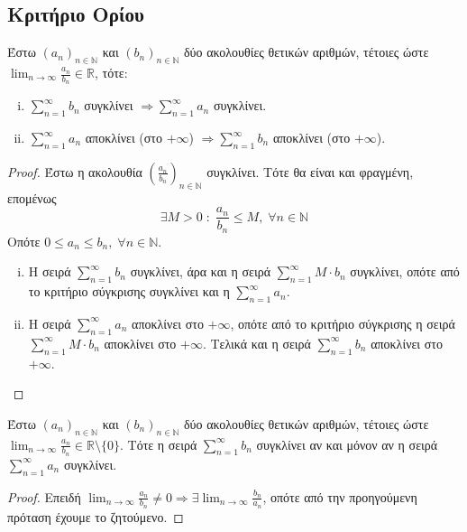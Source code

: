\documentclass[main.tex]{subfiles}
\begin{document}
\subsection{Κριτήριο Ορίου}
\begin{thm}
    Έστω $ {(a_{n})}_{n \in \mathbb{N}} $ και $ {(b_{n})}_{n \in \mathbb{N}} $ δύο 
    ακολουθίες θετικών αριθμών, τέτοιες ώστε $ \lim_{n \to \infty} \frac{a_{n}}{b_{n}}
    \in \mathbb{R} $, τότε: 
    \begin{enumerate}[i)]
        \item $ \sum_{n=1}^{\infty} b_{n} $ συγκλίνει $ \Rightarrow 
            \sum_{n=1}^{\infty} a_{n} $ συγκλίνει.
        \item $ \sum_{n=1}^{\infty} a_{n} $ αποκλίνει (στο $+ \infty$) $ \Rightarrow 
            \sum_{n=1}^{\infty} b_{n} $ αποκλίνει (στο $+ \infty$).
    \end{enumerate}
\end{thm}
\begin{proof}
\item {}
    Έστω η ακολουθία $ {\left(\frac{a_{n}}{b_{n}}\right)}_{n \in \mathbb{N}} $ 
    συγκλίνει.  Τότε θα είναι και φραγμένη, επομένως
    \[
        \exists M>0 \; : \; \frac{a_{n}}{b_{n}} \leq M, \; \forall n \in \mathbb{N} 
    \] 
    Οπότε $ 0 \leq a_{n} \leq b_{n}, \; \forall n \in \mathbb{N} $.
    \begin{enumerate}[i)]
        \item Η σειρά $ \sum_{n=1}^{\infty} b_{n} $ συγκλίνει, άρα και η σειρά 
            $ \sum_{n=1}^{\infty} M\cdot b_{n} $ συγκλίνει, οπότε από το κριτήριο 
            σύγκρισης συγκλίνει και η $ \sum_{n=1}^{\infty} a_{n} $.
        \item Η σειρά $ \sum_{n=1}^{\infty} a_{n} $ αποκλίνει στο $ + \infty $, 
            οπότε από το κριτήριο σύγκρισης η σειρά 
            $ \sum_{n=1}^{\infty} M \cdot b_{n} $ αποκλίνει
            στο $ + \infty $. Τελικά και η σειρά $ \sum_{n=1}^{\infty} b_{n} $ 
            αποκλίνει στο $ + \infty $.
    \end{enumerate}
\end{proof}

\begin{cor}
    Έστω $ {(a_{n})}_{n \in \mathbb{N}} $ και $ {(b_{n})}_{n \in \mathbb{N}} $ δύο 
    ακολουθίες θετικών αριθμών, τέτοιες ώστε $ \lim_{n \to \infty} \frac{a_{n}}{b_{n}} 
    \in \mathbb{R} \setminus \{ 0 \}$. Τότε η σειρά $ \sum_{n=1}^{\infty} b_{n} $ 
    συγκλίνει αν και μόνον αν η σειρά $ \sum_{n=1}^{\infty} a_{n} $ συγκλίνει.
\end{cor}
\begin{proof}
    Επειδή $ \lim_{n \to \infty} \frac{a_{n}}{b_{n}} \neq 0 \Rightarrow \exists 
    \lim_{n \to \infty} \frac{b_{n}}{a_{n}}$, οπότε από την προηγούμενη πρόταση 
    έχουμε το ζητούμενο.
\end{proof}
\end{document}
